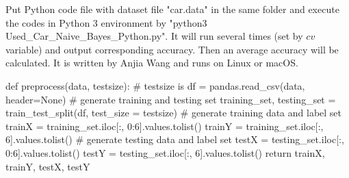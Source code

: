 Put Python code file with dataset file "car.data" in the same folder and execute the codes in Python 3 environment by "python3 Used\_Car\_Naive\_Bayes\_Python.py".
It will run several times (set by $cv$ variable) and output corresponding accuracy.
Then an average accuracy will be calculated.
It is written by Anjia Wang and runs on Linux or macOS.

\begin{mycode}
def preprocess(data, testsize): # testsize is %
    df = pandas.read_csv(data, header=None) # generate training and testing set
    training_set, testing_set = train_test_split(df, test_size = testsize)
    # generate training data and label set
    trainX = training_set.iloc[:, 0:6].values.tolist()
    trainY = training_set.iloc[:, 6].values.tolist()
    # generate testing data and label set    
    testX = testing_set.iloc[:, 0:6].values.tolist()
    testY = testing_set.iloc[:, 6].values.tolist()
    return trainX, trainY, testX, testY
\end{mycode}

